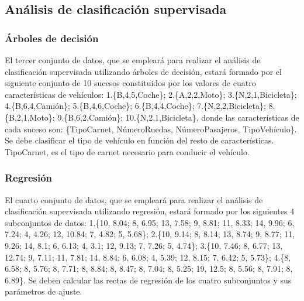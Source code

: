 \documentclass[a4paper, 12pt]{article}
\begin{document}
	\subsection{Análisis de clasificación supervisada}
	
	\subsubsection{Árboles de decisión}
	
	El tercer conjunto de datos, que se empleará para realizar el análisis de clasificación supervisada utilizando árboles de decisión, estará formado por el siguiente conjunto de 10 sucesos constituidos por los valores de cuatro características de vehículos: 1.\{B,4,5,Coche\}; 2.\{A,2,2,Moto\}; 3.\{N,2,1,Bicicleta\}; 4.\{B,6,4,Camión\}; 5.\{B,4,6,Coche\}; 6.\{B,4,4,Coche\}; 7.\{N,2,2,Bicicleta\}; 8.\{B,2,1,Moto\}; 9.\{B,6,2,Camión\}; 10.\{N,2,1,Bicicleta\}, donde las características de cada suceso son: \{TipoCarnet, NúmeroRuedas, NúmeroPasajeros, TipoVehículo\}. Se debe clasificar el tipo de vehículo en función del resto de características. TipoCarnet, es el tipo de carnet necesario para conducir el vehículo.
	
	
	\subsubsection{Regresión}
	
	El cuarto conjunto de datos, que se empleará para realizar el análisis de clasificación supervisada utilizando regresión, estará formado por los siguientes 4 subconjuntos de datos: 1.\{10, 8.04; 8, 6.95; 13, 7.58; 9, 8.81; 11, 8.33; 14, 9.96; 6, 7.24; 4, 4.26; 12, 10.84; 7, 4.82; 5, 5.68\}; 2.\{10, 9.14; 8, 8.14; 13, 8.74; 9, 8.77; 11, 9.26; 14, 8.1; 6, 6.13; 4, 3.1; 12, 9.13; 7, 7.26; 5, 4.74\}; 3.\{10, 7.46; 8, 6.77; 13, 12.74; 9, 7.11; 11, 7.81; 14, 8.84; 6, 6.08; 4, 5.39; 12, 8.15; 7, 6.42; 5, 5.73\}; 4.\{8, 6.58; 8, 5.76; 8, 7.71; 8, 8.84; 8, 8.47; 8, 7.04; 8, 5.25; 19, 12.5; 8, 5.56; 8, 7.91; 8, 6.89\}. Se deben calcular las rectas de regresión de los cuatro subconjuntos y sus parámetros de ajuste.
		
\end{document}
